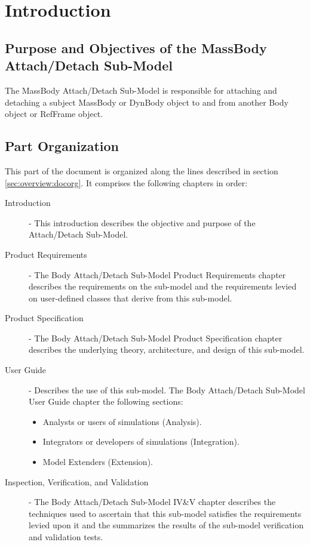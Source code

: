 %
\chapter{Introduction}\label{ch:BodyAttach_Detach:intro}

\section{Purpose and Objectives of the
MassBody Attach/Detach Sub-Model}

The MassBody Attach/Detach Sub-Model
is responsible for attaching and detaching
a subject MassBody or DynBody object to and from another Body object or RefFrame object.

\section{Part Organization}
This part of the \ModelDesc document is organized along the
lines described in section \ref{sec:overview:docorg}. It
comprises the following chapters in order:

\begin{description}
\item[Introduction] -
This introduction describes the objective and purpose of the
Attach/Detach Sub-Model.

\item[Product Requirements] -
The Body Attach/Detach Sub-Model Product Requirements chapter
describes the requirements on the sub-model
and the requirements levied on user-defined classes that derive from
this sub-model.

\item[Product Specification] -
The Body Attach/Detach Sub-Model Product Specification chapter
describes the underlying theory, architecture, and design of
this sub-model.

\item[User Guide] -
Describes the use of this sub-model.
The Body Attach/Detach Sub-Model User Guide chapter
the following sections:
\begin{itemize}
 \item Analysts or users of simulations (Analysis).
 \item Integrators or developers of simulations (Integration).
 \item Model Extenders (Extension).
\end{itemize}

\item[Inspection, Verification, and Validation] -
The Body Attach/Detach Sub-Model IV\&V chapter
describes the techniques used to ascertain that
this sub-model satisfies the requirements levied upon it
and the summarizes the results of
the sub-model verification and validation tests.
\end{description}
